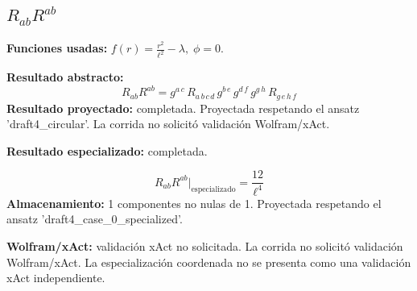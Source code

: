 \documentclass[11pt]{article}
\begin{document}
\subsection*{$ R_{ab}R^{ab} $}
\textbf{Funciones usadas:} $ f\!\left(r\right) = \frac{{r}^{2}}{{\ell}^{2}} - \lambda,\;\phi=0 $.\par
\textbf{Resultado abstracto:}
\begin{dmath*}[breakdepth={5}]
R_{ab}R^{ab} = g{}^{a\,c}\,R{}_{a\,b\,c\,d}\,g{}^{b\,e}\,g{}^{d\,f}\,g{}^{g\,h}\,R{}_{g\,e\,h\,f}
\end{dmath*}
\textbf{Resultado proyectado:} completada. Proyectada respetando el ansatz 'draft4\_circular'. La corrida no solicitó validación Wolfram/xAct.\par
\textbf{Resultado especializado:} completada.\par
\begin{dmath*}[breakdepth={5}]
R_{ab}R^{ab}\big|_{\mathrm{especializado}} = \frac{12}{{\ell}^{4}}
\end{dmath*}
\textbf{Almacenamiento:} 1 componentes no nulas de 1. Proyectada respetando el ansatz 'draft4\_case\_0\_specialized'.\par
\textbf{Wolfram/xAct:} validación xAct no solicitada. La corrida no solicitó validación Wolfram/xAct. La especialización coordenada no se presenta como una validación xAct independiente.\par\medskip
{}
\end{document}

